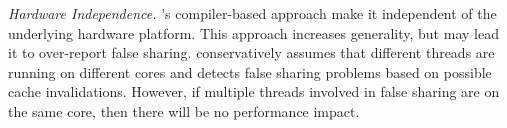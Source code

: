 \emph{Hardware Independence.}  \Predator{}'s compiler-based approach make it independent of the underlying hardware platform. This approach increases generality, but may lead it to over-report false sharing. \Predator{} conservatively assumes that different threads are running on different cores and detects false sharing problems based on possible cache invalidations. However, if multiple threads involved in false sharing are on the same core, then there will be no performance impact. 

